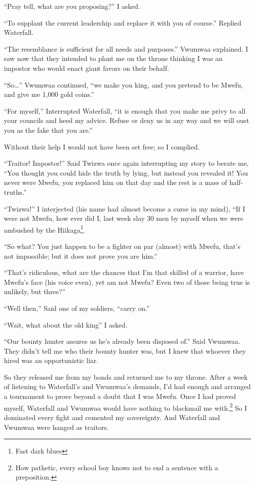 ``Pray tell, what are you proposing?'' I asked.

``To supplant the current leadership and replace it with you of course.'' Replied Waterfall.

``The resemblance is sufficient for all needs and purposes.'' Vwu\-mwaa explained. I saw now that they intended to plant me on the throne thinking I was an impostor who would enact giant favors on their behalf.

``So\ldots'' Vwu\-mwaa continued, ``we make you king, and you pretend to be Mwe\-fu, and give me 1,000 gold coins.''

``For myself,'' Interrupted Waterfall, ``it is enough that you make me privy to all your councils and heed my advice. Refuse or deny us in any way and we will oust you as the fake that you are.''

Without their help I would not have been set free; so I complied.

\tbreak

``Traitor! Impostor!'' Said Twi\-zwa once again interrupting my story to berate me, ``You thought you could hide the truth by lying, but instead you revealed it! You never were Mwe\-fu, you replaced him on that day and the rest is a mass of half-truths.''

``Twi\-zwa!'' I interjected (his name had almost become a curse in my mind), ``If I were not Mwe\-fu, how ever did I, last week slay 30 men by myself when we were ambushed by the Hii\-kaga\footnote{Fast dark blues}.

``So what? You just happen to be a fighter on par (almost) with Mwe\-fu, that's not impossible; but it does not prove you are him.''

``That's ridiculous, what are the chances that I'm that skilled of a warrior, have Mwe\-fu's face (his voice even), yet am not Mwe\-fu? Even two of those being true is unlikely, but three?''

``Well then,'' Said one of my soldiers, ``carry on.''

\tbreak

``Wait, what about the old king'' I asked.

``Our bounty hunter assures us he's already been disposed of.'' Said Vwu\-mwaa. They didn't tell me who their bounty hunter was, but I knew that whoever they hired was an opportunistic liar.

So they released me from my bonds and returned me to my throne. After a week of listening to Waterfall's and Vwu\-mwaa's demands, I'd had enough and arranged a tournament to prove beyond a doubt that I was Mwe\-fu. Once I had proved myself, Waterfall and Vwu\-mwaa would have nothing to blackmail me with.\footnote{How pathetic, every school boy knows not to end a sentence with a preposition.} So I dominated every fight and cemented my sovereignty. And Waterfall and Vwu\-mwaa were hanged as traitors.

